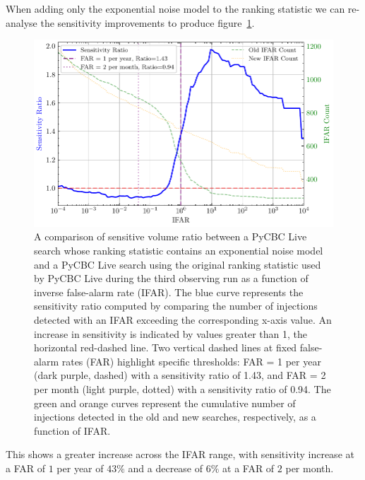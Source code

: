 When adding only the exponential noise model to the ranking statistic we can re-analyse the sensitivity improvements to produce figure~\ref{5:fig:vt-ratio-fits-only}.
%
\begin{figure}
       \centering
    \includegraphics[width=1.0\textwidth]{images/5_pycbclive/fits-only/fits_only_vt_ratio_with_counts.pdf}
    \caption{A comparison of sensitive volume ratio between a PyCBC Live search whose ranking statistic contains an exponential noise model and a PyCBC Live search using the original ranking statistic used by PyCBC Live during the third observing run as a function of inverse false-alarm rate (IFAR). The blue curve represents the sensitivity ratio computed by comparing the number of injections detected with an IFAR exceeding the corresponding x-axis value. An increase in sensitivity is indicated by values greater than 1, the horizontal red-dashed line. Two vertical dashed lines at fixed false-alarm rates (FAR) highlight specific thresholds: FAR = 1 per year (dark purple, dashed) with a sensitivity ratio of 1.43, and FAR = 2 per month (light purple, dotted) with a sensitivity ratio of 0.94. The green and orange curves represent the cumulative number of injections detected in the old and new searches, respectively, as a function of IFAR.}
    \label{5:fig:vt-ratio-fits-only}
\end{figure}
%
This shows a greater increase across the IFAR range, with sensitivity increase at a FAR of $1$ per year of $43\%$ and a decrease of $6\%$ at a FAR of $2$ per month.

